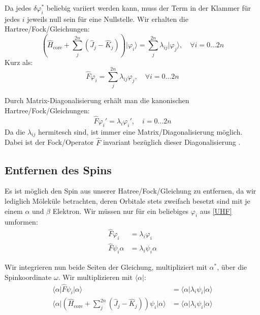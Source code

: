 Da jedes $\delta \varphi_i^*$ beliebig variiert werden kann,
muss der Term in der Klammer für jedes $i$ jeweils null sein für eine Nullstelle.
Wir erhalten die Hartree\-/Fock\-/Gleichungen:
\begin{equation}
  \left(\hat{H}_{\text{core}} + \sum_j^{2n} 
  \left( \hat{J}_j - \hat{K}_j \right)\right)\vert\varphi_i\rangle = 
  \sum_j^{2n}\lambda_{ij} \vert\varphi_j\rangle, \quad \forall i = 0 \dots 2n\nonumber
\end{equation}
Kurz als:
\begin{equation}
  \hat{F}\varphi_i = \sum_j^{2n}\lambda_{ij} \varphi_j, \quad \forall i = 0 \dots 2n
\end{equation}

Durch Matrix-Diagonalisierung erhält man die kanonischen Hartree\-/Fock\-/Gleichungen:
\begin{equation} \label{UHF}
  \hat{F} \varphi_i' = \lambda_i \varphi_i', \quad i = 0 \dots 2n
\end{equation}
Da die $\lambda_{ij}$ hermitesch sind, ist immer eine Matrix\-/Diagonalisierung möglich.
Dabei ist der Fock\-/Operator $\hat{F}$ invariant bezüglich dieser Diagonalisierung
\cite[3.64]{szabo_ostlund_1996}.

\cite[S. 253]{atkins_friedman_2011}
\cite[S. 115-119]{szabo_ostlund_1996}

\subsection{Entfernen des Spins}
Es ist möglich den Spin aus unserer Hatree\-/Fock\-/Gleichung zu entfernen,
da wir lediglich Möleküle betrachten,
deren Orbitale stets zweifach besetzt sind mit je einem $\alpha$ und $\beta$ Elektron.
Wir müssen nur für ein beliebiges $\varphi_i$ aus \cref{UHF} umformen:
\begin{align*}
  \hat{F} \varphi_i &= \lambda_i \varphi_i \\
  \hat{F} \psi_i \alpha &= \lambda_i \psi_i \alpha
\end{align*}

Wir integrieren nun beide Seiten der Gleichung,
multipliziert mit $\alpha^*$, über die Spinkoordinate $\omega$.
Wir multiplizieren mit $\langle \alpha \vert$:
\begin{align*}
  \langle \alpha \vert \hat{F} \psi_i \vert \alpha \rangle &= 
  \langle \alpha \vert\lambda_i \psi_i \vert \alpha \rangle\\
  \langle \alpha \vert \left(\hat{H}_{\text{core}} + \sum_j^{2n} 
  \left( \hat{J}_j - \hat{K}_j \right)\right) \psi_i \vert \alpha \rangle &= 
  \langle \alpha \vert \lambda_i \psi_i \vert \alpha \rangle
\end{align*}


